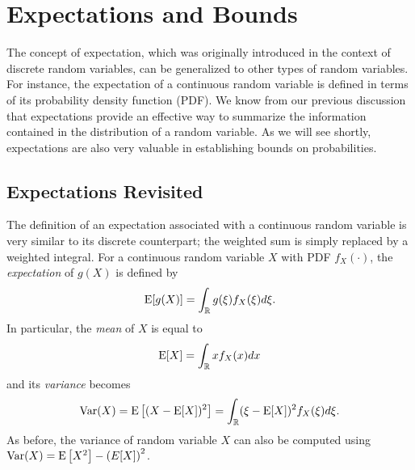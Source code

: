 \chapter{Expectations and Bounds}

The concept of expectation, which was originally introduced in the context of discrete random variables, can be generalized to other types of random variables.
For instance, the expectation of a continuous random variable is defined in terms of its probability density function (PDF).
We know from our previous discussion that expectations provide an effective way to summarize the information contained in the distribution of a random variable.
As we will see shortly, expectations are also very valuable in establishing bounds on probabilities.


\section{Expectations Revisited}

The definition of an expectation associated with a continuous random variable is very similar to its discrete counterpart;
the weighted sum is simply replaced by a weighted integral.
For a continuous random variable $X$ with PDF $f_X(\cdot)$, the \emph{expectation} of $g(X)$ is defined by 
\begin{equation*}
\mathrm{E} [g(X)]
= \int_{\mathbb{R}} g(\xi) f_X (\xi) d\xi .
\end{equation*}
In particular, the \emph{mean} of $X$ is equal to 
\begin{equation*}
\mathrm{E} [X]
= \int_{\mathbb{R}} x f_X (x) dx
\end{equation*}
and its \emph{variance} becomes 
\begin{equation*}
\mathrm{Var} (X) = \mathrm{E} \left[ (X - \mathrm{E}[X])^2 \right]
= \int_{\mathbb{R}} (\xi - \mathrm{E}[X])^2 f_X (\xi) d\xi .
\end{equation*}
As before, the variance of random variable $X$ can also be computed using $\mathrm{Var}(X) = \mathrm{E} \left[ X^2 \right] - \left( E[X] \right)^2$.

